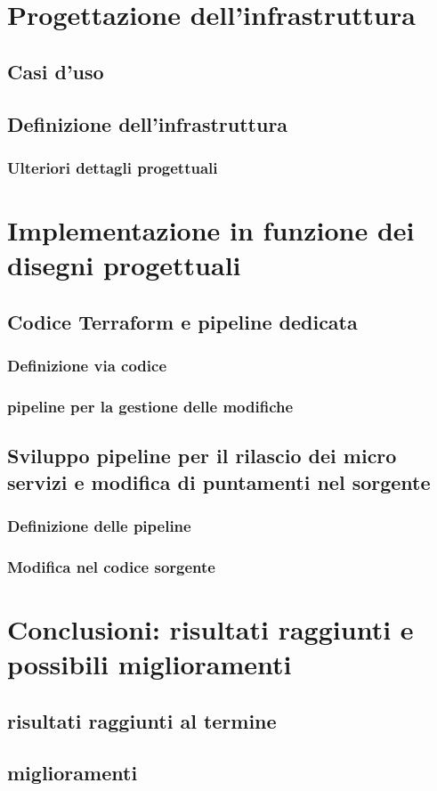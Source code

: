 \documentclass[a4paper,12pt]{report}
\begin{document}
\chapter{Progettazione dell'infrastruttura}
\section{Casi d'uso}
\section{Definizione dell'infrastruttura}
\subsection{Ulteriori dettagli progettuali}

\chapter{Implementazione in funzione dei disegni progettuali}
\section{Codice Terraform e pipeline dedicata}
\subsection{Definizione via codice}
\subsection{pipeline per la gestione delle modifiche}
\section{Sviluppo pipeline per il rilascio dei micro servizi e modifica di puntamenti nel sorgente}
\subsection{Definizione delle pipeline}
\subsection{Modifica nel codice sorgente}

\chapter{Conclusioni: risultati raggiunti e possibili miglioramenti}
\section{risultati raggiunti al termine}
\section{miglioramenti}

%
%
\begin{thebibliography}{00}
%
%
%
\end{thebibliography}
% 
\end{document}
